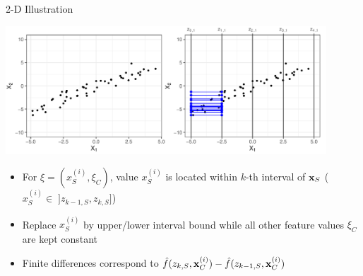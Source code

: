 \documentclass[11pt,compress,t,notes=noshow, aspectratio=169, xcolor=table]{beamer}
\begin{document}
\begin{frame}{2-D Illustration}
\centerline{\includegraphics[width=0.9\textwidth]{figure/ale_interval}}

 \begin{itemize}
  \item For $\xi = (x_S^{(i)}, \xi_C)$, value $x_S^{(i)}$ is located within $k$-th interval of $\xv_S$ ($x_S^{(i)} \in \; ]z_{k-1, S}, z_{k, S}]$)
  \item Replace $x_S^{(i)}$ by upper/lower interval bound while all other feature values $\xi_C$ are kept constant
  \item Finite differences correspond to $\fh(z_{k, S}, \xi_C) - \fh(z_{k-1, S}, \xi_C)$
\end{itemize}

\end{frame}
\end{document}
